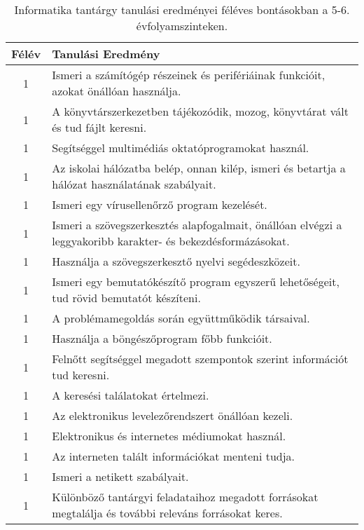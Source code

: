        
           \begin{longtable}{c | p{} }
            \caption[Informatika 5-6.]{Informatika tantárgy tanulási eredményei féléves bontásokban a 5-6. évfolyamszinteken. }  \\

            \textbf{Félév} & \textbf{Tanulási Eredmény} \\
            \hline
            \endhead
                                
                                          1 &  Ismeri a számítógép részeinek és perifériáinak funkcióit, azokat önállóan használja. \\ \hline
                                          1 &  A könyvtárszerkezetben tájékozódik, mozog, könyvtárat vált és tud fájlt keresni. \\ \hline
                                          1 &  Segítséggel multimédiás oktatóprogramokat használ. \\ \hline
                                          1 &  Az iskolai hálózatba belép, onnan kilép, ismeri és betartja a hálózat használatának szabályait. \\ \hline
                                          1 &  Ismeri egy vírusellenőrző program kezelését. \\ \hline
                                          1 &  Ismeri a szövegszerkesztés alapfogalmait, önállóan elvégzi a leggyakoribb karakter- és bekezdésformázásokat. \\ \hline
                                          1 &  Használja a szövegszerkesztő nyelvi segédeszközeit. \\ \hline
                                          1 &  Ismeri egy bemutatókészítő program egyszerű lehetőségeit, tud rövid bemutatót készíteni. \\ \hline
                                          1 &  A problémamegoldás során együttműködik társaival. \\ \hline
                                          1 &  Használja a böngészőprogram főbb funkcióit. \\ \hline
                                          1 &  Felnőtt segítséggel megadott szempontok szerint információt tud keresni. \\ \hline
                                          1 &  A keresési találatokat értelmezi. \\ \hline
                                          1 &  Az elektronikus levelezőrendszert önállóan kezeli. \\ \hline
                                          1 &  Elektronikus és internetes médiumokat használ. \\ \hline
                                          1 &  Az interneten talált információkat menteni tudja. \\ \hline
                                          1 &  Ismeri a netikett szabályait. \\ \hline
                                          1 &  Különböző tantárgyi feladataihoz megadott forrásokat megtalálja és további releváns forrásokat keres. \\ \hline
                                      

\end{longtable}
